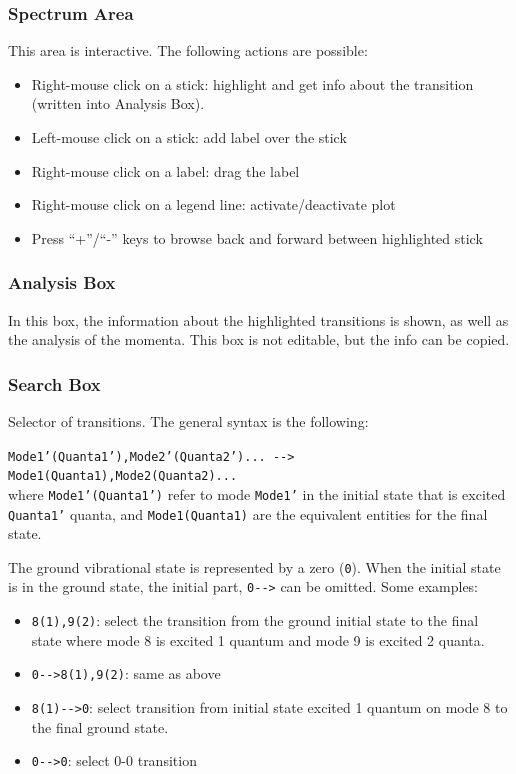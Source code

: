 \documentclass[a4paper,11pt]{article}
\begin{document}
\subsubsection{Spectrum Area}
This area is interactive. The following actions are possible:
\begin{itemize}
 \item Right-mouse click on a stick: highlight and get info about the transition (written into Analysis Box).
 \item Left-mouse click on a stick: add label over the stick
 \item Right-mouse click on a label: drag the label
 \item Right-mouse click on a legend line: activate/deactivate plot
 \item Press ``+''/``-'' keys to browse back and forward between highlighted stick
\end{itemize}

\subsubsection{Analysis Box}
In this box, the information about the highlighted transitions is shown, as well as the analysis of the momenta. This box is not editable, but the info can be copied.

\subsubsection{Search Box}
Selector of transitions. The general syntax is the following:

{
\scriptsize
\texttt{Mode1'(Quanta1'),Mode2'(Quanta2')... {-}{-}> Mode1(Quanta1),Mode2(Quanta2)...}
}\\

where \texttt{Mode1'(Quanta1')} refer to mode \texttt{Mode1'} in the initial state that is excited \texttt{Quanta1'} quanta, and \texttt{Mode1(Quanta1)} are the equivalent entities for the final state.

The ground vibrational state is represented by a zero (\texttt{0}). When the initial state is in the ground state, the initial part, \texttt{0{-}{-}>} can be omitted. Some examples:

\begin{itemize}
 \item \texttt{8(1),9(2)}: select the transition from the ground initial state to the final state where mode 8 is excited 1 quantum and mode 9 is excited 2 quanta.
 \item \texttt{0{-}{-}>8(1),9(2)}: same as above
 \item \texttt{8(1){-}{-}>0}: select transition from initial state excited 1 quantum on mode 8 to the final ground state.
 \item \texttt{0{-}{-}>0}: select 0-0 transition
\end{itemize}
\end{document}
